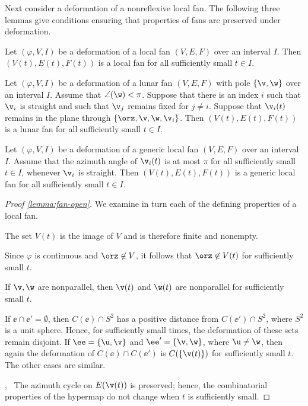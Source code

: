 Next consider a deformation of a nonreflexive local fan.  The following 
three lemmas give conditions ensuring that  properties of fans are
preserved under deformation.


\begin{lemma}\label{lemma:fan-open}
  Let $(\varphi,V,I)$ be a deformation of a  local fan
  $(V,E,F)$ over an interval $I$. 
Then $(V(t),E(t),F(t))$ is a
local fan for all sufficiently small $t\in I$.
\end{lemma}

\begin{lemma}\label{lemma:fan-open-lunar}
  Let $(\varphi,V,I)$ be a deformation of a lunar fan $(V,E,F)$ with pole $\{\v,\w\}$
  over
  an interval $I$.  Assume that $\angle(\w)<\pi$.
  Suppose that there is an index $i$ such that
  $\v_i$ is straight and such that $\v_j$ remains fixed for $j\ne i$.
  Suppose that $\v_i(t)$ remains in the plane through
  $\{\orz,\v,\w,\v_i\}$.  Then $(V(t),E(t),F(t))$
 is a lunar fan for
  all sufficiently small $t\in I$.
\end{lemma}

\begin{lemma}\label{lemma:fan-open-generic}
Let $(\varphi,V,I)$ be a deformation of a generic local fan
  $(V,E,F)$ over an interval $I$.  
Assume that the azimuth angle of $\v_i(t)$ is at most
$\pi$ for all sufficiently small $t\in I$, whenever $\v_i$ is straight.  Then 
 $(V(t),E(t),F(t))$ is a
generic local fan for all sufficiently small $t\in I$.
\end{lemma}

\begin{proof}[Proof \eqref{lemma:fan-open}] 
We examine in turn each of the defining properties of a local fan.

 The set $V(t)$ is the image of $V$ and is
therefore finite and nonempty.

 Since $\varphi$ is continuous and
$\orz\not\in V$, it follows that $\orz\not\in V(t)$ for sufficiently
small $t$.

 If $\v,\w$ are nonparallel, then $\v(t)$ and
$\w(t)$ are nonparallel for sufficiently small $t$.

 If $\ee \cap \ee'=\emptyset$, then $C(\ee)\cap
S^2$ has a positive distance from $C(\ee')\cap S^2$, where $S^2$ is a unit sphere.  
Hence, for
sufficiently small times, the deformation of these sets remain
disjoint.  If $\ee=\{\u,\v\}$ and $\ee'=\{\v,\w\}$, where $\u\ne\w$,
then again the deformation of $C(\ee)\cap C(\ee')$ is
$C(\{\v(t)\})$ for sufficiently small $t$.  The other cases are
similar.
%

,~ The azimuth cycle on $E(\v(t))$
is preserved; hence, the combinatorial properties of the hypermap do
not change when $t$ is sufficiently small.
\end{proof}

